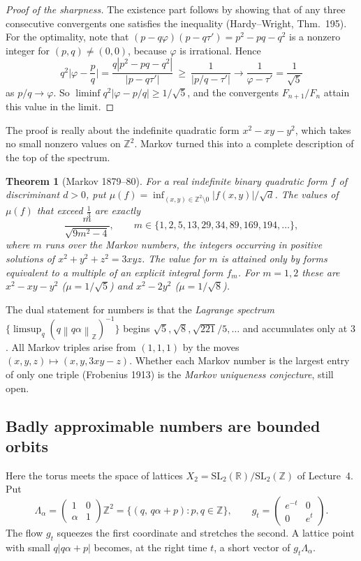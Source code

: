 \documentclass[11pt,openany]{book}
\theoremstyle{plain}
\newtheorem{theorem}{Theorem}[chapter]
\theoremstyle{definition}
\theoremstyle{remark}
\newcommand{\R}{\mathbb{R}}
\newcommand{\Z}{\mathbb{Z}}
\newcommand{\Lat}{\Lambda}             %
\newcommand{\SL}{\mathrm{SL}}
\newcommand{\abs}[1]{\left\lvert #1 \right\rvert}
\newcommand{\norm}[1]{\left\lVert #1 \right\rVert}
\begin{document}
\begin{proof}[Proof of the sharpness]
The existence part follows by showing that of any three consecutive convergents one satisfies the
inequality (Hardy--Wright, Thm.~195). For the optimality, note that
$(p-q\varphi)(p-q\tau')=p^2-pq-q^2$ is a nonzero integer for $(p,q)\neq(0,0)$, because $\varphi$ is
irrational. Hence
\[
  q^2\Big|\varphi-\frac pq\Big|=\frac{q\abs{p^2-pq-q^2}}{\abs{p-q\tau'}}\ \ge\ \frac{1}{\abs{p/q-\tau'}}
  \longrightarrow\frac1{\varphi-\tau'}=\frac1{\sqrt5}
\]
as $p/q\to\varphi$. So $\liminf q^2\abs{\varphi-p/q}\ge1/\sqrt5$, and the convergents
$F_{n+1}/F_n$ attain this value in the limit.
\end{proof}

The proof is really about the indefinite quadratic form $x^2-xy-y^2$, which takes no small nonzero
values on $\Z^2$. Markov turned this into a complete description of the top of the spectrum.

\begin{theorem}[Markov 1879--80]\label{ERG:thm:markov}
For a real indefinite binary quadratic form $f$ of discriminant $d>0$, put
$\mu(f)=\inf_{(x,y)\in\Z^2\setminus0}\abs{f(x,y)}/\sqrt d$. The values of $\mu(f)$ that exceed $\frac13$
are exactly
\[
  \frac{m}{\sqrt{9m^2-4}},\qquad m\in\{1,2,5,13,29,34,89,169,194,\dots\},
\]
where $m$ runs over the \emph{Markov numbers}, the integers occurring in positive solutions of
$x^2+y^2+z^2=3xyz$. The value for $m$ is attained only by forms equivalent to a multiple of an
explicit integral form $f_m$. For $m=1,2$ these are $x^2-xy-y^2$ ($\mu=1/\sqrt5$) and $x^2-2y^2$
($\mu=1/\sqrt8$).
\end{theorem}

The dual statement for numbers is that the \emph{Lagrange spectrum}
$\{\limsup_q(q\norm{q\alpha}_\Z)^{-1}\}$ begins $\sqrt5,\sqrt8,\sqrt{221}/5,\dots$ and accumulates
only at $3$. All Markov triples arise from $(1,1,1)$ by the moves $(x,y,z)\mapsto(x,y,3xy-z)$. Whether
each Markov number is the largest entry of only one triple (Frobenius 1913) is the \emph{Markov
uniqueness conjecture}, still open.

\subsection*{Badly approximable numbers are bounded orbits}

Here the torus meets the space of lattices $X_2=\SL_2(\R)/\SL_2(\Z)$ of Lecture~4. Put
\[
  \Lat_\alpha=\begin{pmatrix}1&0\\ \alpha&1\end{pmatrix}\Z^2=\{(q,\,q\alpha+p):p,q\in\Z\},
  \qquad g_t=\begin{pmatrix}e^{-t}&0\\0&e^{t}\end{pmatrix}.
\]
The flow $g_t$ squeezes the first coordinate and stretches the second. A lattice point with small
$q\abs{q\alpha+p}$ becomes, at the right time $t$, a short vector of $g_t\Lat_\alpha$.
\end{document}
